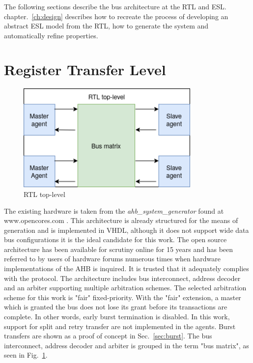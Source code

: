 The following sections describe the bus architecture at the RTL and ESL. chapter.~\ref{ch:design} describes how to recreate the process of developing an abstract ESL model from the RTL, how to generate the system and automatically refine properties.  
\newpage

\section{Register Transfer Level}
\begin{figure}[hbt]
    \begin{center}
        \includegraphics[width=0.8\textwidth]{figs/hw/RTL_top.png}
    \end{center}
    \caption{RTL top-level}
    \label{fig:rtl-top}
\end{figure}

The existing hardware is taken from the \textit{ahb\_system\_generator} found at \\
 www.opencores.com \cite{ahbsys}. This architecture is already structured for the means of generation and is implemented in VHDL, although it does not support wide data bus configurations it is the ideal candidate for this work. The open source architecture has been available for scrutiny online for 15 years and has been referred to by users of hardware forums numerous times when hardware implementations of the AHB is inquired. It is trusted that it adequately complies with the protocol. The architecture includes bus interconnect, address decoder and an arbiter supporting multiple arbitration schemes. The selected arbitration scheme for this work is "fair" fixed-priority. With the "fair" extension, a master which is granted the bus does not lose its grant before its transactions are complete. In other words, early burst termination is disabled. In this work, support for split and retry transfer are not implemented in the agents. Burst transfers are shown as a proof of concept in Sec.~\ref{sec:burst}. The bus interconnect, address decoder and arbiter is grouped in the term "bus matrix", as seen in Fig.~\ref{fig:rtl-top}.\par   


